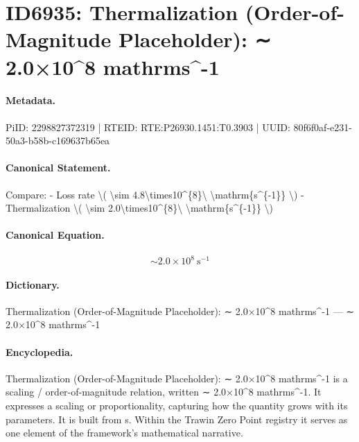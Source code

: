 \section*{ID6935: Thermalization (Order-of-Magnitude Placeholder): ∼ 2.0×10\textasciicircum{}8 mathrms\textasciicircum{}-1}
\paragraph{Metadata.}
PiID: 2298827372319 | RTEID: RTE:P26930.1451:T0.3903 | UUID: 80f6f0af-e231-50a3-b58b-c169637b65ea

\paragraph{Canonical Statement.}
Compare: - Loss rate \textbackslash{}( \textbackslash{}sim 4.8\textbackslash{}times10\textasciicircum{}\{8\}\textbackslash{} \textbackslash{}mathrm\{s\textasciicircum{}\{-1\}\} \textbackslash{}) - Thermalization \textbackslash{}( \textbackslash{}sim 2.0\textbackslash{}times10\textasciicircum{}\{8\}\textbackslash{} \textbackslash{}mathrm\{s\textasciicircum{}\{-1\}\} \textbackslash{})

\paragraph{Canonical Equation.}
\[
\sim 2.0\times10^{8}\ \mathrm{s^{-1}}
\]

\paragraph{Dictionary.}
Thermalization (Order-of-Magnitude Placeholder): ∼ 2.0×10\textasciicircum{}8 mathrms\textasciicircum{}-1 — ∼ 2.0×10\textasciicircum{}8 mathrms\textasciicircum{}-1

\paragraph{Encyclopedia.}
Thermalization (Order-of-Magnitude Placeholder): ∼ 2.0×10\textasciicircum{}8 mathrms\textasciicircum{}-1 is a scaling / order-of-magnitude relation, written ∼ 2.0×10\textasciicircum{}8 mathrms\textasciicircum{}-1. It expresses a scaling or proportionality, capturing how the quantity grows with its parameters. It is built from s. Within the Trawin Zero Point registry it serves as one element of the framework's mathematical narrative.
